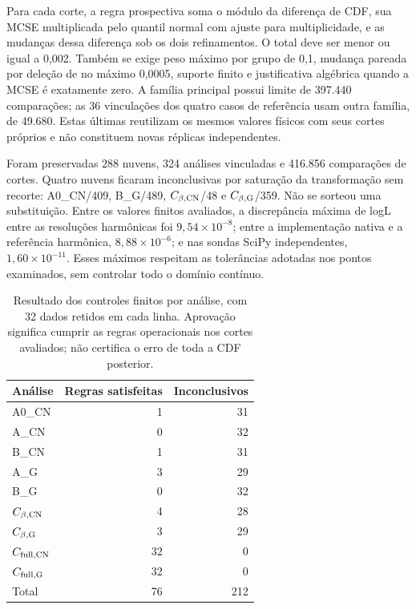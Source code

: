 Para cada corte, a regra prospectiva soma o módulo da diferença de CDF,
sua MCSE multiplicada pelo quantil normal com ajuste para multiplicidade,
e as mudanças dessa diferença sob os dois refinamentos. O total deve
ser menor ou igual a 0,002. Também se exige peso máximo por grupo de
0,1, mudança pareada por deleção de no máximo 0,0005, suporte finito e
justificativa algébrica quando a MCSE é exatamente zero. A família
principal possui limite de 397.440 comparações; as 36 vinculações dos
quatro casos de referência usam outra família, de 49.680. Estas últimas
reutilizam os mesmos valores físicos com seus cortes próprios e não
constituem novas réplicas independentes.

Foram preservadas 288 nuvens, 324 análises vinculadas e 416.856
comparações de cortes. Quatro nuvens ficaram inconclusivas por saturação
da transformação sem recorte: A0\_CN/409, B\_G/489,
$C_{\beta,\rm CN}$/48 e $C_{\beta,\rm G}$/359. Não se sorteou uma
substituição. Entre os valores finitos avaliados, a discrepância máxima
de logL entre as resoluções harmônicas foi $9{,}54\times10^{-8}$;
entre a implementação nativa e a referência harmônica,
$8{,}88\times10^{-6}$; e nas sondas SciPy independentes,
$1{,}60\times10^{-11}$. Esses máximos respeitam as tolerâncias adotadas
nos pontos examinados, sem controlar todo o domínio contínuo.

\begin{table}[htbp]
\centering\small
\caption{Resultado dos controles finitos por análise, com 32 dados
retidos em cada linha. Aprovação significa cumprir as regras operacionais
nos cortes avaliados; não certifica o erro de toda a CDF posterior.}
\label{tab:comp-controles-finitos}
\begin{tabular}{lrr}
\toprule
Análise & Regras satisfeitas & Inconclusivos\\
\midrule
A0\_CN & 1 & 31\\
A\_CN & 0 & 32\\
B\_CN & 1 & 31\\
A\_G & 3 & 29\\
B\_G & 0 & 32\\
$C_{\beta,\rm CN}$ & 4 & 28\\
$C_{\beta,\rm G}$ & 3 & 29\\
$C_{{\rm full},\rm CN}$ & 32 & 0\\
$C_{{\rm full},\rm G}$ & 32 & 0\\
\midrule
Total & 76 & 212\\
\bottomrule
\end{tabular}
\end{table}

